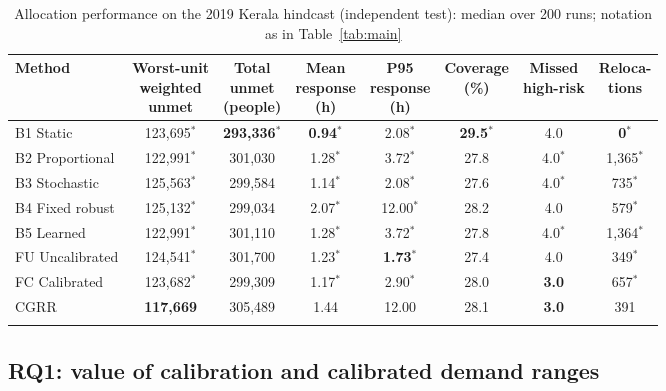\documentclass[pdflatex,sn-basic]{sn-jnl}
\theoremstyle{plain}%
\theoremstyle{remark}%
\theoremstyle{definition}%
\begin{document}
\begin{table}[h]
\caption{Allocation performance on the 2019 Kerala hindcast (independent test): median over 200 runs; notation as in Table~\ref{tab:main}}\label{tab:main2019}
\footnotesize
\begin{tabular*}{\textwidth}{@{\extracolsep\fill}lccccccc}
\toprule
Method & \makecell{Worst-unit\\weighted\\unmet} & \makecell{Total\\unmet\\(people)} & \makecell{Mean\\response\\(h)} & \makecell{P95\\response\\(h)} & \makecell{Coverage\\(\%)} & \makecell{Missed\\high-risk} & \makecell{Reloca-\\tions} \\
\midrule
B1 Static & 123,695$^{\ast}$ & \textbf{293,336}$^{\ast}$ & \textbf{0.94}$^{\ast}$ & 2.08$^{\ast}$ & \textbf{29.5}$^{\ast}$ & 4.0 & \textbf{0}$^{\ast}$ \\
B2 Proportional & 122,991$^{\ast}$ & 301,030 & 1.28$^{\ast}$ & 3.72$^{\ast}$ & 27.8 & 4.0$^{\ast}$ & 1,365$^{\ast}$ \\
B3 Stochastic & 125,563$^{\ast}$ & 299,584 & 1.14$^{\ast}$ & 2.08$^{\ast}$ & 27.6 & 4.0$^{\ast}$ & 735$^{\ast}$ \\
B4 Fixed robust & 125,132$^{\ast}$ & 299,034 & 2.07$^{\ast}$ & 12.00$^{\ast}$ & 28.2 & 4.0 & 579$^{\ast}$ \\
B5 Learned & 122,991$^{\ast}$ & 301,110 & 1.28$^{\ast}$ & 3.72$^{\ast}$ & 27.8 & 4.0$^{\ast}$ & 1,364$^{\ast}$ \\
FU Uncalibrated & 124,541$^{\ast}$ & 301,700 & 1.23$^{\ast}$ & \textbf{1.73}$^{\ast}$ & 27.4 & 4.0 & 349$^{\ast}$ \\
FC Calibrated & 123,682$^{\ast}$ & 299,309 & 1.17$^{\ast}$ & 2.90$^{\ast}$ & 28.0 & \textbf{3.0} & 657$^{\ast}$ \\
CGRR & \textbf{117,669} & 305,489 & 1.44 & 12.00 & 28.1 & \textbf{3.0} & 391 \\
\botrule
\end{tabular*}
\end{table}

\subsection{RQ1: value of calibration and calibrated demand ranges}
\end{document}
